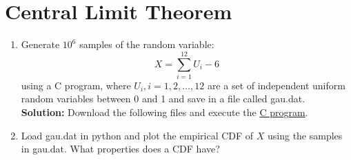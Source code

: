 \documentclass[journal,12pt,twocolumn]{IEEEtran}
\numberwithin{equation}{section}
\renewcommand\thesection{\arabic{section}}
\newcommand{\solution}{\noindent \textbf{Solution: }}
\providecommand{\link}[2]{{\color{blue}\href{https://github.com/SterbenVD/AI1110-Assignments/Assignment/#1}{#2}}}
\begin{document}
\section{Central Limit Theorem}
\begin{enumerate}[label=\thesection.\arabic*,ref=\thesection.\theenumi]
\item Generate $10^6$ samples of the random variable:
\begin{equation}
X = \sum_{i=1}^{12}U_i -6
\end{equation}
using a C program, where $U_i, i = 1,2,\dots, 12$ are  a set of independent uniform random variables between 0 and 1
and save in a file called gau.dat.
\\
\solution Download the following files and execute the \link{codes/2-1.c}{C program}.
\\
\item Load gau.dat in python and plot the empirical CDF of $X$ using the samples in gau.dat. What properties does a CDF have?


\end{enumerate}
\end{document}
